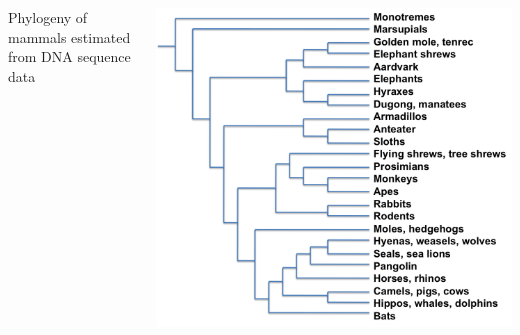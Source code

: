         

\begin{noheadline}
\begin{frame}
    \begin{adjustwidth}{-1.5em}{-1.5em}
        \begin{columns}

            Phylogeny of mammals estimated from DNA sequence data


            \includegraphics[width=1.02\columnwidth]{mammal-tree.png}

        \end{columns}

    \end{adjustwidth}
\end{frame}
\end{noheadline}

